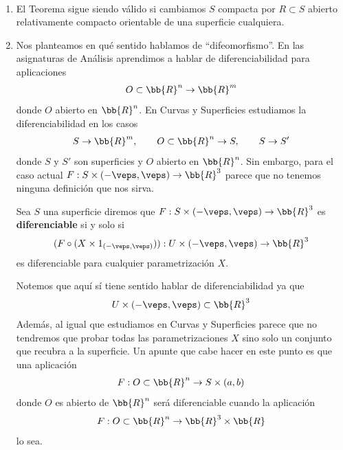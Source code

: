 \begin{observacion}\
    \begin{enumerate}
        \item El Teorema sigue siendo válido si cambiamos $S$ compacta por $R\subset S$ abierto relativamente compacto orientable de una superficie cualquiera.
        
        \item Nos planteamos en qué sentido hablamos de ``difeomorfismo''. En las asignaturas de Análisis aprendimos a hablar de diferenciabilidad para aplicaciones
        \begin{gather*}
            O\subset \bb{R}^n \to \bb{R}^m
        \end{gather*}
        donde $O$ abierto en $\bb{R}^n$. En Curvas y Superficies estudiamos la diferenciabilidad en los casos 
        \begin{gather*}
            S \to \bb{R}^m, \qquad O\subset \bb{R}^n \to S, \qquad S\to S'
        \end{gather*}
        donde $S$ y $S'$ son superficies y $O$ abierto en $\bb{R}^n$. Sin embargo, para el caso actual $F: S\times (-\veps, \veps) \to \bb{R}^3$ parece que no tenemos ninguna definición que nos sirva. 

        \begin{definicion}
            Sea $S$ una superficie diremos que $F: S\times (-\veps, \veps) \to \bb{R}^3$ es \textbf{diferenciable} si y solo si 
            \begin{gather*}
                (F \circ (X\times 1_{(-\veps, \veps)})) : U \times (-\veps, \veps) \to \bb{R}^3
            \end{gather*}
            es diferenciable para cualquier parametrización $X$.
        \end{definicion}

        Notemos que aquí sí tiene sentido hablar de diferenciabilidad ya que
        \begin{gather*}
            U\times(-\veps, \veps) \subset \bb{R}^3
        \end{gather*}
        Además, al igual que estudiamos en Curvas y Superficies parece que no tendremos que probar todas las parametrizaciones $X$ sino solo un conjunto que recubra a la superficie. Un apunte que cabe hacer en este punto es que una aplicación
        \begin{gather*}
            F : O\subset \bb{R}^n \to S \times (a,b)
        \end{gather*}
        donde $O$ es abierto de $\bb{R}^n$ será diferenciable cuando la aplicación
        \begin{gather*}
            F : O\subset \bb{R}^n \to \bb{R}^3 \times \bb{R}
        \end{gather*}
        lo sea.
    \end{enumerate}
\end{observacion}

